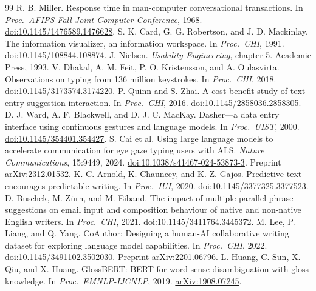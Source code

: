 \documentclass[11pt,a4paper]{article}
\begin{document}
\begingroup
\footnotesize
\begin{thebibliography}{99}
\setlength{\itemsep}{2pt}
 R. B. Miller. Response time in man-computer conversational transactions. In \emph{Proc.\ AFIPS Fall Joint Computer Conference}, 1968. \href{https://doi.org/10.1145/1476589.1476628}{doi:10.1145/1476589.1476628}.
 S. K. Card, G. G. Robertson, and J. D. Mackinlay. The information visualizer, an information workspace. In \emph{Proc.\ CHI}, 1991. \href{https://doi.org/10.1145/108844.108874}{doi:10.1145/108844.108874}.
 J. Nielsen. \emph{Usability Engineering}, chapter 5. Academic Press, 1993.
 V. Dhakal, A. M. Feit, P. O. Kristensson, and A. Oulasvirta. Observations on typing from 136 million keystrokes. In \emph{Proc.\ CHI}, 2018. \href{https://doi.org/10.1145/3173574.3174220}{doi:10.1145/3173574.3174220}.
 P. Quinn and S. Zhai. A cost-benefit study of text entry suggestion interaction. In \emph{Proc.\ CHI}, 2016. \href{https://doi.org/10.1145/2858036.2858305}{doi:10.1145/2858036.2858305}.
 D. J. Ward, A. F. Blackwell, and D. J. C. MacKay. Dasher---a data entry interface using continuous gestures and language models. In \emph{Proc.\ UIST}, 2000. \href{https://doi.org/10.1145/354401.354427}{doi:10.1145/354401.354427}.
 S. Cai et al. Using large language models to accelerate communication for eye gaze typing users with ALS. \emph{Nature Communications}, 15:9449, 2024. \href{https://doi.org/10.1038/s41467-024-53873-3}{doi:10.1038/s41467-024-53873-3}. Preprint \href{https://arxiv.org/abs/2312.01532}{arXiv:2312.01532}.
 K. C. Arnold, K. Chauncey, and K. Z. Gajos. Predictive text encourages predictable writing. In \emph{Proc.\ IUI}, 2020. \href{https://doi.org/10.1145/3377325.3377523}{doi:10.1145/3377325.3377523}.
 D. Buschek, M. Z\"urn, and M. Eiband. The impact of multiple parallel phrase suggestions on email input and composition behaviour of native and non-native English writers. In \emph{Proc.\ CHI}, 2021. \href{https://doi.org/10.1145/3411764.3445372}{doi:10.1145/3411764.3445372}.
 M. Lee, P. Liang, and Q. Yang. CoAuthor: Designing a human-AI collaborative writing dataset for exploring language model capabilities. In \emph{Proc.\ CHI}, 2022. \href{https://doi.org/10.1145/3491102.3502030}{doi:10.1145/3491102.3502030}. Preprint \href{https://arxiv.org/abs/2201.06796}{arXiv:2201.06796}.
 L. Huang, C. Sun, X. Qiu, and X. Huang. GlossBERT: BERT for word sense disambiguation with gloss knowledge. In \emph{Proc.\ EMNLP-IJCNLP}, 2019. \href{https://arxiv.org/abs/1908.07245}{arXiv:1908.07245}.

\end{thebibliography}
\end{document}
